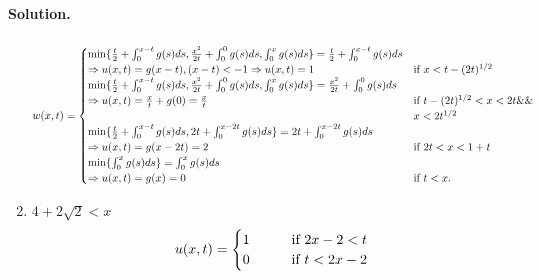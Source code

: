 \documentclass[a4paper]{book}
\newenvironment{solution}%
{\noindent\textbf{Solution.}}%
{\qedhere}
\numberwithin{equation}{chapter}
\theoremstyle{definition}
\begin{document}
\begin{solution}
\begin{enumerate}
\[    \]
    \[w(x,t) =
      \begin{cases}
        \min\{\frac{t}{2} + \int_0^{x-t} g(s)ds, \frac{x^2}{2t} + \int_0^{0} g(s)ds, \int_0^{x} g(s)ds\} = \frac{t}{2} + \int_0^{x-t} g(s)ds \\ \Rightarrow u(x,t)  = g(x-t),(x - t) < -1  \Rightarrow u(x,t) = 1 \qquad &\textmd{if } x < t - (2t)^{1/2} \\
        \min\{\frac{t}{2} + \int_0^{x-t} g(s)ds, \frac{x^2}{2t} + \int_0^{0} g(s)ds, \int_0^{x} g(s)ds \} = \frac{x^2}{2t} + \int_0^{0} g(s)ds \\\Rightarrow u(x,t) = \frac{x}{t} + g(0) = \frac{x}{t}  \qquad &\textmd{if }  t - (2t)^{1/2} < x < 2t \&\&\\ &x < 2t^{1/2} \\
        \min\{\frac{t}{2} + \int_0^{x-t} g(s)ds, 2t + \int_0^{x-2t} g(s)ds\} = 2t + \int_0^{x-2t} g(s)ds \\ \Rightarrow u(x,t) = g(x-2t) = 2  \qquad &\textmd{if } 2t < x < 1 + t \\
        \min\{\int_0^{x} g(s)ds\} = \int_0^{x} g(s)ds \\ \Rightarrow u(x,t) = g(x) = 0  \qquad &\textmd{if }  t < x.
      \end{cases}
    \]

  \item  $4 + 2\sqrt{2} < x$
    \[u(x,t) =
      \begin{aligned}
        \begin{cases}
          1 \qquad & \textmd{if } 2x -2 < t \\
          0 \qquad & \textmd{if } t < 2x -2  \\
        \end{cases}
      \end{aligned}
    \]
  \end{enumerate}


\end{solution}
\end{document}
